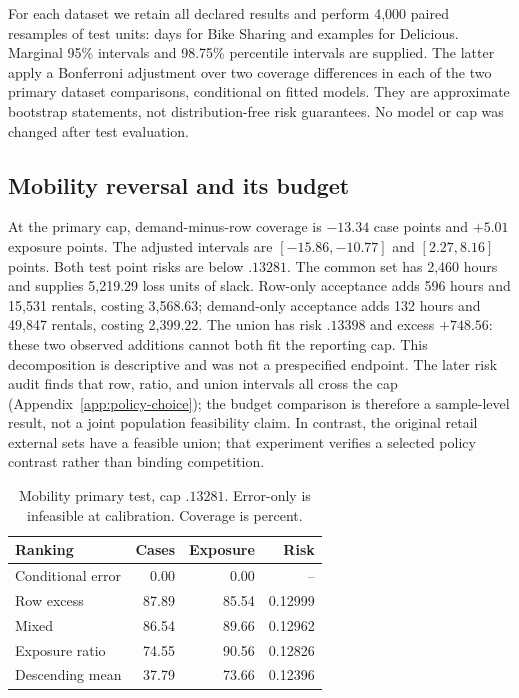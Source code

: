 For each dataset we retain all declared results and perform 4,000 paired resamples of test units: days for Bike Sharing and examples for Delicious. Marginal 95\% intervals and 98.75\% percentile intervals are supplied. The latter apply a Bonferroni adjustment over two coverage differences in each of the two primary dataset comparisons, conditional on fitted models. They are approximate bootstrap statements, not distribution-free risk guarantees. No model or cap was changed after test evaluation.

\subsection{Mobility reversal and its budget}
At the primary cap, demand-minus-row coverage is $-13.34$ case points and $+5.01$ exposure points. The adjusted intervals are $[-15.86,-10.77]$ and $[2.27,8.16]$ points. Both test point risks are below $.13281$. The common set has 2,460 hours and supplies 5,219.29 loss units of slack. Row-only acceptance adds 596 hours and 15,531 rentals, costing 3,568.63; demand-only acceptance adds 132 hours and 49,847 rentals, costing 2,399.22. The union has risk $.13398$ and excess $+748.56$: these two observed additions cannot both fit the reporting cap. This decomposition is descriptive and was not a prespecified endpoint. The later risk audit finds that row, ratio, and union intervals all cross the cap (Appendix~\ref{app:policy-choice}); the budget comparison is therefore a sample-level result, not a joint population feasibility claim. In contrast, the original retail external sets have a feasible union; that experiment verifies a selected policy contrast rather than binding competition.

\begin{table}[t]\centering\small
\caption{Mobility primary test, cap $.13281$. Error-only is infeasible at calibration. Coverage is percent.}\label{tab:mobility}
\begin{tabular}{lrrr}\toprule
Ranking & Cases & Exposure & Risk\\\midrule
Conditional error & 0.00 & 0.00 & --\\
Row excess & 87.89 & 85.54 & 0.12999\\
Mixed & 86.54 & 89.66 & 0.12962\\
Exposure ratio & 74.55 & 90.56 & 0.12826\\
Descending mean & 37.79 & 73.66 & 0.12396\\
\bottomrule\end{tabular}\end{table}

